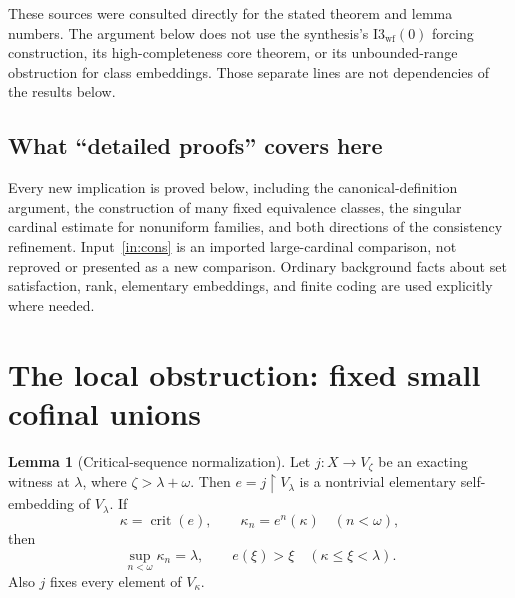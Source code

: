 \documentclass[11pt,letterpaper]{article}
\theoremstyle{definition}
\newtheorem{lemma}[definition]{Lemma}
\newcommand{\crit}{\operatorname{crit}}
\newcommand{\restr}{\mathbin{\upharpoonright}}
\numberwithin{equation}{section}
\begin{document}
These sources were consulted directly for the stated theorem and lemma
numbers. The argument below does not use the synthesis's
$\mathrm{I3}_{\mathrm{wf}}(0)$ forcing construction, its high-completeness
core theorem, or its unbounded-range obstruction for class embeddings.
Those separate lines are not dependencies of the results below.

\subsection{What ``detailed proofs'' covers here}

Every new implication is proved below, including the canonical-definition
argument, the construction of many fixed equivalence classes, the singular
cardinal estimate for nonuniform families, and both directions of the
consistency refinement. Input~\ref{in:cons} is an imported large-cardinal
comparison, not reproved or presented as a new comparison. Ordinary background
facts about set satisfaction, rank, elementary embeddings, and finite coding
are used explicitly where needed.

\section{The local obstruction: fixed small cofinal unions}\label{sec:local}

\begin{lemma}[Critical-sequence normalization]\label{lem:critical}
Let $j:X\to V_\zeta$ be an exacting witness at $\lambda$, where
$\zeta>\lambda+\omega$. Then $e=j\restr V_\lambda$ is a nontrivial elementary
self-embedding of $V_\lambda$. If
\[
 \kappa=\crit(e),\qquad \kappa_n=e^n(\kappa)\quad(n<\omega),
\]
then
\[
 \sup_{n<\omega}\kappa_n=\lambda,
 \qquad e(\xi)>\xi\quad(\kappa\le\xi<\lambda).
\]
Also $j$ fixes every element of $V_\kappa$.
\end{lemma}
\end{document}
